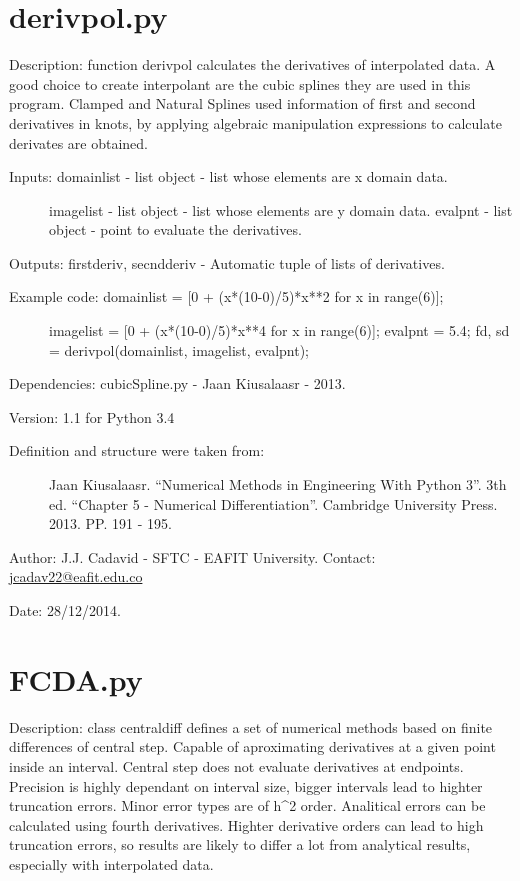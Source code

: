 \documentclass[letterpaper,10pt,oneside]{sphinxmanual}
\theoremstyle{plain}%
\theoremstyle{definition}%
\theoremstyle{remark}%
\begin{document}
\section{derivpol.py}
\label{code:module-derivpol}\label{code:derivpol-py}
Description: function derivpol calculates the derivatives of interpolated
data. A good choice to create interpolant are the cubic splines they are
used in this program. Clamped and Natural Splines used information of
first and second derivatives in knots, by applying algebraic manipulation
expressions to calculate derivates are obtained.
\begin{description}
\item[{Inputs: domainlist - list object - list whose elements are x domain data.}] \leavevmode
imagelist - list object - list whose elements are y domain data.
evalpnt - list object - point to evaluate the derivatives.

\end{description}

Outputs: firstderiv, secndderiv - Automatic tuple of lists of derivatives.
\begin{description}
\item[{Example code: domainlist = {[}0 + (x*(10-0)/5)*x**2 for x in range(6){]};}] \leavevmode
imagelist = {[}0 + (x*(10-0)/5)*x**4 for x in range(6){]};
evalpnt = 5.4;
fd, sd = derivpol(domainlist, imagelist, evalpnt);

\end{description}

Dependencies: cubicSpline.py - Jaan Kiusalaasr - 2013.

Version: 1.1 for Python 3.4
\begin{description}
\item[{Definition and structure were taken from:}] \leavevmode
Jaan Kiusalaasr. ``Numerical Methods in Engineering With Python 3''.
3th ed. ``Chapter 5 - Numerical Differentiation''. 
Cambridge University Press. 2013. PP. 191 - 195.

\end{description}

Author: J.J. Cadavid - SFTC - EAFIT University.
Contact: \href{mailto:jcadav22@eafit.edu.co}{jcadav22@eafit.edu.co}

Date: 28/12/2014.


\section{FCDA.py}
\label{code:module-FCDA}\label{code:fcda-py}
Description: class centraldiff defines a set of numerical methods based on
finite differences of central step. Capable of aproximating derivatives at
a given point inside an interval. Central step does not evaluate derivatives
at endpoints. Precision is highly dependant on interval size, bigger intervals
lead to highter truncation errors. Minor error types are of h\textasciicircum{}2 order.
Analitical errors can be calculated using fourth derivatives. Highter
derivative orders can lead to high truncation errors, so results are likely
to differ a lot from analytical results, especially with interpolated data.
\end{document}
